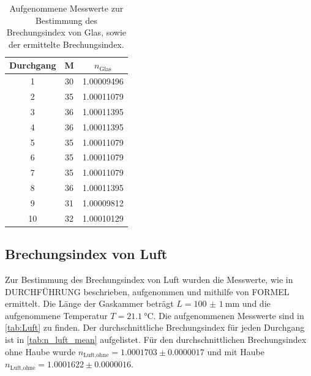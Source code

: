\begin{table}[h]
  \centering
  \caption{Aufgenommene Messwerte zur Bestimmung des Brechungsindex von Glas, sowie der ermittelte Brechungsindex.}
  \label{tab:Glas}
  \begin{tabular}{c c c}
    \toprule
    Durchgang & M & $n_\text{Glas}$ \\
    \midrule
    1    &   30    &   1.00009496\\   
    2    &   35    &   1.00011079\\   
    3    &   36    &   1.00011395\\   
    4    &   36    &   1.00011395\\   
    5    &   35    &   1.00011079\\   
    6    &   35    &   1.00011079\\   
    7    &   35    &   1.00011079\\   
    8    &   36    &   1.00011395\\   
    9    &   31    &   1.00009812\\   
    10   &   32    &   1.00010129\\   
    \bottomrule
  \end{tabular}
\end{table}

\subsection{Brechungsindex von Luft}
\label{subsec:n_Luft}
Zur Bestimmung des Brechungsindex von Luft wurden die Messwerte, wie in DURCHFÜHRUNG beschrieben, aufgenommen und mithilfe von FORMEL ermittelt.
Die Länge der Gaskammer beträgt $L = \SI[separate-uncertainty = true]{100(1)}{\milli\metre}$ \cite{anleitung} und die aufgenommene Temperatur $T = \SI{21.1}{\celsius}$.
Die aufgenommenen Messwerte sind in \autoref{tab:Luft} zu finden.
Der durchschnittliche Brechungsindex für jeden Durchgang ist in \autoref{tab:n_luft_mean} aufgelistet.
Für den durchschnittlichen Brechungsindex ohne Haube wurde $n_\text{Luft,ohne} = 1.0001703 \pm 0.0000017 $ und mit Haube $n_\text{Luft,ohne} =  1.0001622 \pm 0.0000016 $.

